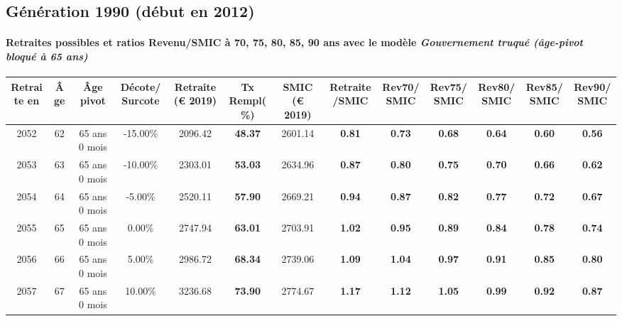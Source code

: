 \newpage 
 
\subsection{Génération 1990 (début en 2012)} 

\paragraph{Retraites possibles et ratios Revenu/SMIC à 70, 75, 80, 85, 90 ans avec le modèle \emph{Gouvernement truqué (âge-pivot bloqué à 65 ans)}}  
 
{ \scriptsize \begin{center} 
\begin{tabular}[htb]{|c|c||c|c||c|c||c||c|c|c|c|c|c|} 
\hline 
 Retraite en &  Âge &  Âge pivot &  Décote/Surcote &  Retraite (\euro{} 2019) &  Tx Rempl(\%) &  SMIC (\euro{} 2019) &  Retraite/SMIC &  Rev70/SMIC &  Rev75/SMIC &  Rev80/SMIC &  Rev85/SMIC &  Rev90/SMIC \\ 
\hline \hline 
 2052 &  62 &  65 ans 0 mois &  -15.00\% &  2096.42 &  {\bf 48.37} &  2601.14 &  {\bf {\color{red} 0.81}} &  {\bf {\color{red} 0.73}} &  {\bf {\color{red} 0.68}} &  {\bf {\color{red} 0.64}} &  {\bf {\color{red} 0.60}} &  {\bf {\color{red} 0.56}} \\ 
\hline 
 2053 &  63 &  65 ans 0 mois &  -10.00\% &  2303.01 &  {\bf 53.03} &  2634.96 &  {\bf {\color{red} 0.87}} &  {\bf {\color{red} 0.80}} &  {\bf {\color{red} 0.75}} &  {\bf {\color{red} 0.70}} &  {\bf {\color{red} 0.66}} &  {\bf {\color{red} 0.62}} \\ 
\hline 
 2054 &  64 &  65 ans 0 mois &  -5.00\% &  2520.11 &  {\bf 57.90} &  2669.21 &  {\bf {\color{red} 0.94}} &  {\bf {\color{red} 0.87}} &  {\bf {\color{red} 0.82}} &  {\bf {\color{red} 0.77}} &  {\bf {\color{red} 0.72}} &  {\bf {\color{red} 0.67}} \\ 
\hline 
 2055 &  65 &  65 ans 0 mois &  0.00\% &  2747.94 &  {\bf 63.01} &  2703.91 &  {\bf 1.02} &  {\bf {\color{red} 0.95}} &  {\bf {\color{red} 0.89}} &  {\bf {\color{red} 0.84}} &  {\bf {\color{red} 0.78}} &  {\bf {\color{red} 0.74}} \\ 
\hline 
 2056 &  66 &  65 ans 0 mois &  5.00\% &  2986.72 &  {\bf 68.34} &  2739.06 &  {\bf 1.09} &  {\bf 1.04} &  {\bf {\color{red} 0.97}} &  {\bf {\color{red} 0.91}} &  {\bf {\color{red} 0.85}} &  {\bf {\color{red} 0.80}} \\ 
\hline 
 2057 &  67 &  65 ans 0 mois &  10.00\% &  3236.68 &  {\bf 73.90} &  2774.67 &  {\bf 1.17} &  {\bf 1.12} &  {\bf 1.05} &  {\bf {\color{red} 0.99}} &  {\bf {\color{red} 0.92}} &  {\bf {\color{red} 0.87}} \\ 
\hline 
\hline 
\end{tabular} 
\end{center} } 
